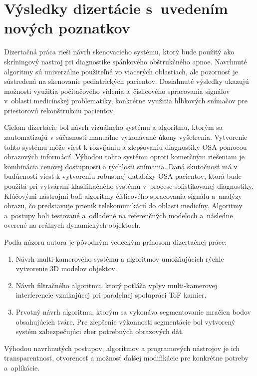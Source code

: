 \chapter{Výsledky dizertácie s uvedením nových poznatkov}

\pagestyle{fancy}
\fancyhf{}
\fancyfoot[CE,CO]{\thepage}


Dizertačná práca rieši návrh skenovacieho systému, ktorý bude použitý ako skríningový nastroj pri diagnostike spánkového obštrukčného apnoe. Navrhnuté algoritmy sú univerzálne použiteľné vo viacerých oblastiach, ale pozornosť je sústredená na skenovanie pediatrických pacientov. Dosiahnuté výsledky ukazujú možnosti využitia počítačového videnia a číslicového spracovania signálov v oblasti medicínskej problematiky, konkrétne využitia hĺbkových snímačov pre priestorovú rekonštrukciu pacientov. \newline  
 
Cieľom dizertácie bol návrh vizuálneho systému a algoritmu, ktorým sa zautomatizujú v súčasnosti manuálne vykonávané úkony vyšetrenia. Vytvorenie tohto systému môže viesť k rozvíjaniu a zlepšovaniu diagnostiky OSA pomocou obrazových informácií. Výhodou tohto systému oproti komerčným riešeniam je kombinácia cenovej dostupnosti a rýchlosti snímania. Daná skutočnosť má v budúcnosti viesť k vytvoreniu robustnej databázy OSA pacientov, ktorá bude použitá pri vytváraní klasifikačného systému v procese sofistikovanej diagnostiky. Kľúčovými nástrojmi boli algoritmy číslicového spracovania signálu a analýzy obrazu, čo predstavuje prienik telekomunikácií do oblasti medicíny. Algoritmy a postupy boli testované a odladené na referenčných modeloch a následne overené na reálnych dynamických objektoch. \newpage 

\noindent Podľa názoru autora je pôvodným vedeckým prínosom dizertačnej práce:
\begin{enumerate}
	\item Návrh multi-kamerového systému a algoritmov umožňujúcich rýchle vytvorenie 3D modelov objektov.
	\item Návrh filtračného algoritmu, ktorý potláča vplyv multi-kamerovej interferencie vznikajúcej pri paralelnej spolupráci ToF kamier. 
	\item Prvotný návrh algoritmu, ktorým sa vykonáva segmentovanie mračien bodov obsahujúcich tváre. Pre zlepšenie výkonnosti segmentácie bol vytvorený systém zabezpečujúci zber potrebných obrazových dát.	
\end{enumerate}


Výhodou navrhnutých postupov, algoritmov a programových nástrojov je ich transparentnosť, otvorenosť a možnosť ďalšej modifikácie pre konkrétne potreby a aplikácie.

